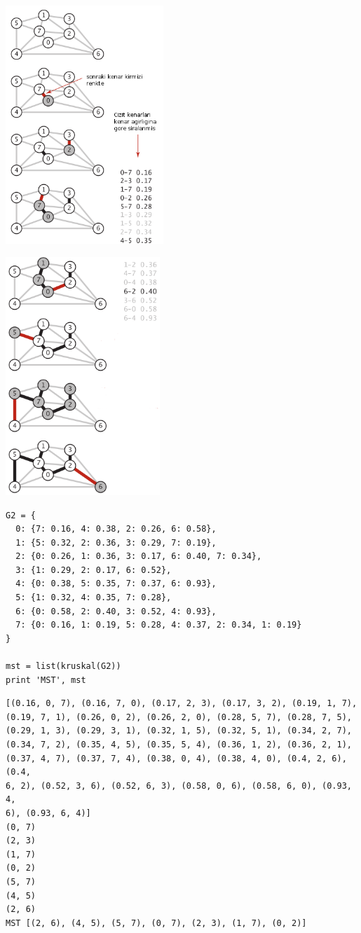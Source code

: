 \documentclass[12pt,fleqn]{article}\usepackage{../common}
\begin{document}
\includegraphics[height=9cm]{sedge_krus_1.png}

\includegraphics[height=9cm]{sedge_krus_2.png}


\begin{verbatim}
G2 = {
  0: {7: 0.16, 4: 0.38, 2: 0.26, 6: 0.58},
  1: {5: 0.32, 2: 0.36, 3: 0.29, 7: 0.19},
  2: {0: 0.26, 1: 0.36, 3: 0.17, 6: 0.40, 7: 0.34},
  3: {1: 0.29, 2: 0.17, 6: 0.52},
  4: {0: 0.38, 5: 0.35, 7: 0.37, 6: 0.93},
  5: {1: 0.32, 4: 0.35, 7: 0.28},
  6: {0: 0.58, 2: 0.40, 3: 0.52, 4: 0.93},
  7: {0: 0.16, 1: 0.19, 5: 0.28, 4: 0.37, 2: 0.34, 1: 0.19}
} 

mst = list(kruskal(G2))
print 'MST', mst
\end{verbatim}

\begin{verbatim}
[(0.16, 0, 7), (0.16, 7, 0), (0.17, 2, 3), (0.17, 3, 2), (0.19, 1, 7),
(0.19, 7, 1), (0.26, 0, 2), (0.26, 2, 0), (0.28, 5, 7), (0.28, 7, 5),
(0.29, 1, 3), (0.29, 3, 1), (0.32, 1, 5), (0.32, 5, 1), (0.34, 2, 7),
(0.34, 7, 2), (0.35, 4, 5), (0.35, 5, 4), (0.36, 1, 2), (0.36, 2, 1),
(0.37, 4, 7), (0.37, 7, 4), (0.38, 0, 4), (0.38, 4, 0), (0.4, 2, 6), (0.4,
6, 2), (0.52, 3, 6), (0.52, 6, 3), (0.58, 0, 6), (0.58, 6, 0), (0.93, 4,
6), (0.93, 6, 4)] 
(0, 7)
(2, 3)
(1, 7)
(0, 2)
(5, 7)
(4, 5)
(2, 6)
MST [(2, 6), (4, 5), (5, 7), (0, 7), (2, 3), (1, 7), (0, 2)]
\end{verbatim}
\end{document}
